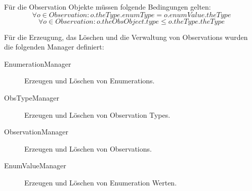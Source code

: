Für die Observation Objekte müssen folgende Bedingungen gelten:
\begin{equation}\forall o \in Observation: o.theType.enumType = o.enumValue.theType
\end{equation}
\begin{equation}\forall o \in Observation: o.theObsObject.type \leq o.theType.theType
\end{equation}

Für die Erzeugung, das Löschen und die Verwaltung von Observations wurden die folgenden Manager definiert:
\begin{description}
\item[EnumerationManager] Erzeugen und Löschen von Enumerations.
\item[ObsTypeManager] Erzeugen und Löschen von Observation Types.
\item[ObservationManager] Erzeugen und Löschen von Observations.
\item[EnumValueManager] Erzeugen und Löschen von Enumeration Werten.
\end{description}
